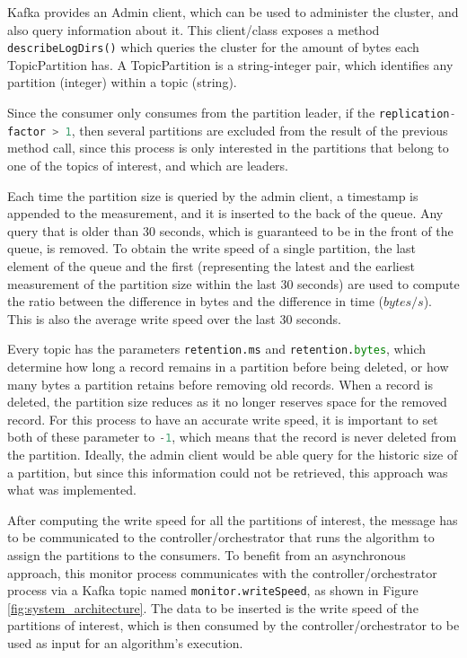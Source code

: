 Kafka provides an Admin client, which can be used to administer the cluster, and
also query information about it. This client/class exposes a method
\lstinline[language=Python]{describeLogDirs()} which queries the cluster for the
amount of bytes each TopicPartition has. A TopicPartition is a string-integer
pair, which identifies any partition (integer) within a topic (string). 

Since the consumer only consumes from the partition leader, if the
\lstinline[language=Python]{replication-factor > 1}, then several partitions are
excluded from the result of the previous method call, since this process is only
interested in the partitions that belong to one of the topics of interest, and
which are leaders.

Each time the partition size is queried by the admin client, a timestamp is
appended to the measurement, and it is inserted to the back of the queue. Any
query that is older than $30$ seconds, which is guaranteed to be in the front of the
queue, is removed. To obtain the write speed of a single partition, the last
element of the queue and the first (representing the latest and the earliest
measurement of the partition size within the last $30$ seconds) are used to compute the
ratio between the difference in bytes and the difference in time ($bytes/s$).
This is also the average write speed over the last 30 seconds.

Every topic has the parameters \lstinline[language=Python]{retention.ms} and
\lstinline[language=Python]{retention.bytes}, which determine how long a record
remains in a partition before being deleted, or how many bytes a partition
retains before removing old records. When a record is deleted, the partition
size reduces as it no longer reserves space for the removed record. For this
process to have an accurate write speed, it is important to set both of these
parameter to \lstinline[language=Python]{-1}, which means that the record is
never deleted from the partition. Ideally, the admin client would be able query
for the historic size of a partition, but since this information could not be
retrieved, this approach was what was implemented.

After computing the write speed for all the partitions of interest, the message
has to be communicated to the controller/orchestrator that runs the algorithm to
assign the partitions to the consumers. To benefit from an asynchronous
approach, this monitor process communicates with the controller/orchestrator
process via a Kafka topic named \lstinline{monitor.writeSpeed}, as shown in
Figure \ref{fig:system_architecture}. The data to be inserted is the write speed
of the partitions of interest, which is then consumed by the
controller/orchestrator to be used as input for an algorithm's execution.

